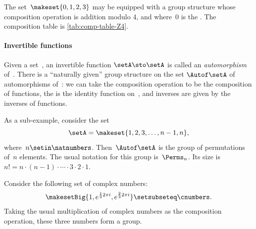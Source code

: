 \begin{example}
    \label{exa:grp-Z4}
    The set~$\makeset{0, 1, 2, 3 }$ may be equipped with a group structure whose composition operation is addition modulo 4, and where~$0$ is the .
    The composition table is \cref{tab:comp-table-Z4}.
\end{example}




\paragraph{Invertible functions}


\begin{example}
    Given a set~\setA, an invertible function $\setA \sto \setA$ is called an \emph{automorphism} of~\setA.
    There is a ``naturally given'' group structure on the set $\Autof\setA$ of automorphisms of~\setA:
    we can take the composition operation to be the composition of functions, the  is the identity function on~\setA, and inverses are given by the inverses of functions.

    As a sub-example, consider the set
    \begin{equation}
        \setA = \makeset{1, 2, 3, \dots, n-1, n},
    \end{equation}
    where~$n \setin \natnumbers$.
    Then~$\Autof\setA$ is the group of permutations of~$n$ elements.
    The usual notation for this group is~$\Perms_n$.
    Its size is~$n! = n \cdot (n-1) \cdot \cdots \cdot 3 \cdot 2 \cdot 1$.

\end{example}



\begin{example}
    \label{grp-order-three}
    Consider the following set of complex numbers:
    \begin{equation}
        \makesetBig{ 1, e^{\frac{1}{3}2\pi i}, e^{\frac{2 }{3}2\pi i} } \setsubseteq \cnumbers.
    \end{equation}
    Taking the usual multiplication of complex numbers as the composition operation, these three numbers form a group.
\end{example}

